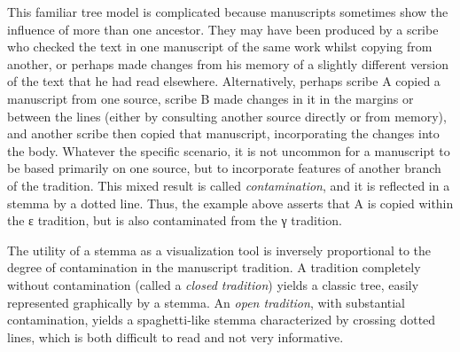 This familiar tree model is complicated because manuscripts sometimes show the influence of more than one ancestor. They may have been produced by a scribe who checked the text in one manuscript of the same work whilst copying from another, or perhaps made changes from his memory of a slightly different version of the text that he had read elsewhere. Alternatively, perhaps scribe A copied a manuscript from one source, scribe B made changes in it in the margins or between the lines (either by consulting another source directly or from memory), and another scribe then copied that manuscript, incorporating the changes into the body. Whatever the specific scenario, it is not uncommon for a manuscript to be based primarily on one source, but to incorporate features of another branch of the tradition. This mixed result is called \textit{contamination}, and it is reflected in a stemma by a dotted line. Thus, the example above asserts that A is copied within the ε tradition, but is also contaminated from the γ tradition.\par
The utility of a stemma as a visualization tool is inversely proportional to the degree of contamination in the manuscript tradition. A tradition completely without contamination (called a \textit{closed tradition}) yields a classic tree, easily represented graphically by a stemma. An \textit{open tradition}, with substantial contamination, yields a spaghetti-like stemma characterized by crossing dotted lines, which is both difficult to read and not very informative.\par
